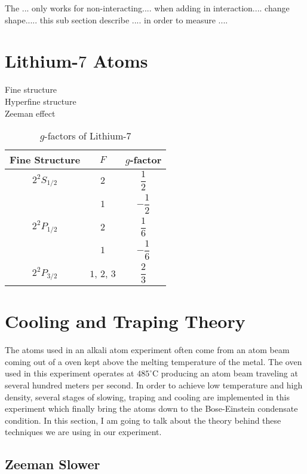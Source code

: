 The ... only works for non-interacting.... when adding in interaction.... change shape..... this sub section describe .... in order to measure ....

\section{Lithium-$7$ Atoms}

Fine structure\\
Hyperfine structure\\
Zeeman effect

\begin{table}
  \caption{$g$-factors of Lithium-$7$}
  \label{li7:g-factors}
  \begin{center}
    \begin{tabular}{|c|c|c|}\hline
      Fine Structure & $F$ & $g$-factor \\\hline
      $2^2S_{1/2}$ & $2$ & $\dfrac 12$ \\\cline{2-3}
      & $1$ & $-\dfrac 12$ \\\hline
      $2^2P_{1/2}$ & $2$ & $\dfrac 16$ \\\cline{2-3}
      & $1$ & $-\dfrac 16$ \\\hline
      $2^2P_{3/2}$ & $1$, $2$, $3$ & $\dfrac 23$ \\\hline
    \end{tabular}
  \end{center}
\end{table}


\section{Cooling and Traping Theory}

The atoms used in an alkali atom experiment often come from an atom beam coming out of a oven kept above the melting temperature of the metal. The oven used in this experiment operates at $485^\circ\text{C}$ producing an atom beam traveling at several hundred meters per second. In order to achieve low temperature and high density, several stages of slowing, traping and cooling are implemented in this experiment which finally bring the atoms down to the Bose-Einstein condensate condition. In this section, I am going to talk about the theory behind these techniques we are using in our experiment.

\subsection{Zeeman Slower}\label{theory:zeeman}

